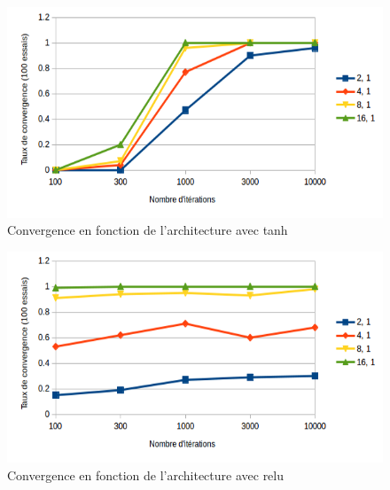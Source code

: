 \documentclass{report}
\theoremstyle{plain}
\theoremstyle{definition}
\theoremstyle{remark}
\begin{document}
\begin{figure}[!h]
\begin{center}
\includegraphics[scale=0.6]{images/xor_architecture_tanh.png}
\caption{Convergence en fonction de l'architecture avec tanh}
\label{xor_architecture_tanh}
\end{center}
\end{figure}

\begin{figure}[!h]
\begin{center}
\includegraphics[scale=0.6]{images/xor_architecture_relu.png}
\caption{Convergence en fonction de l'architecture avec relu}
\label{xor_architecture_relu}
\end{center}
\end{figure}
\end{document}
